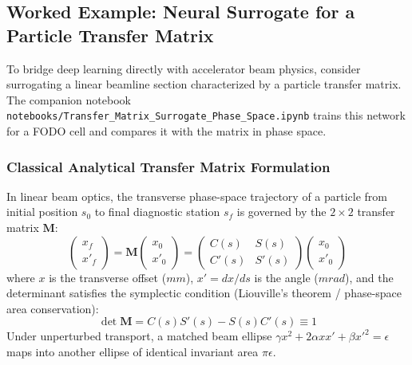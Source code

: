 \documentclass[11pt,a4paper]{article}
\begin{document}
\subsection{Worked Example: Neural Surrogate for a Particle Transfer Matrix}
To bridge deep learning directly with accelerator beam physics, consider surrogating a linear beamline section characterized by a particle transfer matrix. The companion notebook \texttt{notebooks/Transfer\_Matrix\_Surrogate\_Phase\_Space.ipynb} trains this network for a FODO cell and compares it with the matrix in phase space.

\subsubsection{Classical Analytical Transfer Matrix Formulation}
In linear beam optics, the transverse phase-space trajectory of a particle from initial position $s_0$ to final diagnostic station $s_f$ is governed by the $2 \times 2$ transfer matrix $\mathbf{M}$:
\begin{equation}
    \begin{pmatrix} x_f \\ x'_f \end{pmatrix} = \mathbf{M} \begin{pmatrix} x_0 \\ x'_0 \end{pmatrix} = \begin{pmatrix} C(s) & S(s) \\ C'(s) & S'(s) \end{pmatrix} \begin{pmatrix} x_0 \\ x'_0 \end{pmatrix}
\end{equation}
where $x$ is the transverse offset ($mm$), $x' = dx/ds$ is the angle ($mrad$), and the determinant satisfies the symplectic condition (Liouville's theorem / phase-space area conservation):
\begin{equation}
    \det \mathbf{M} = C(s)S'(s) - S(s)C'(s) \equiv 1
\end{equation}
Under unperturbed transport, a matched beam ellipse $\gamma x^2 + 2\alpha x x' + \beta x'^2 = \epsilon$ maps into another ellipse of identical invariant area $\pi \epsilon$.
\end{document}
